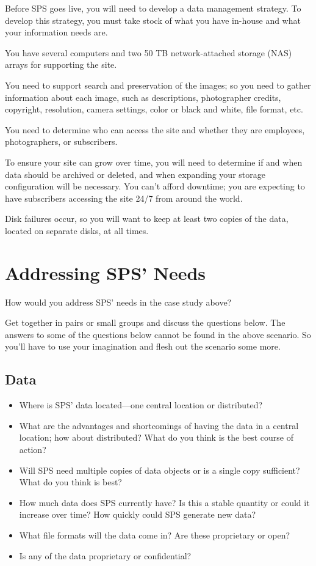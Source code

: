 \documentclass[10pt,oneside]{memoir}
\begin{document}
Before SPS goes live, you will need to develop a data management strategy. To develop this strategy, you must take stock of what you have in-house and what your information needs are.

You have several computers and two 50 TB network-attached storage (NAS) arrays for supporting the site.

You need to support search and preservation of the images; so you need to gather information about each image, such as descriptions, photographer credits, copyright, resolution, camera settings, color or black and white, file format, etc.

You need to determine who can access the site and whether they are employees, photographers, or subscribers.

To ensure your site can grow over time, you will need to determine if and when data should be archived or deleted, and when expanding your storage configuration will be necessary. You can't afford downtime; you are expecting to have subscribers accessing the site 24/7 from around the world.

Disk failures occur, so you will want to keep at least two copies of the data, located on separate disks, at all times.

\section{Addressing SPS' Needs}

How would you address SPS' needs in the case study above?

Get together in pairs or small groups and discuss the questions below. The answers to some of the questions below cannot be found in the above scenario. So you'll have to use your imagination and flesh out the scenario some more.

\subsection{Data}

\begin{itemize}
 \item Where is SPS' data located---one central location or distributed?
 \item What are the advantages and shortcomings of having the data in a central location; how about distributed? What do you think is the best course of action?
 \item Will SPS need multiple copies of data objects or is a single copy sufficient? What do you think is best?
 \item How much data does SPS currently have? Is this a stable quantity or could it increase over time? How quickly could SPS generate new data?
 \item What file formats will the data come in? Are these proprietary or open?
 \item Is any of the data proprietary or confidential?
\end{itemize}
\end{document}
